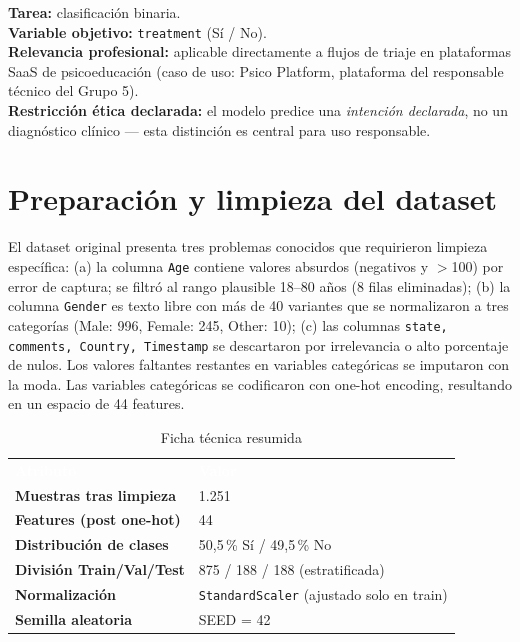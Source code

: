 \documentclass[10pt,a4paper,twocolumn]{article}
\begin{document}
\textbf{Tarea:} clasificación binaria.\\
\textbf{Variable objetivo:} \texttt{treatment} (Sí / No).\\
\textbf{Relevancia profesional:} aplicable directamente a flujos de triaje en plataformas SaaS de psicoeducación (caso de uso: Psico Platform, plataforma del responsable técnico del Grupo 5).\\
\textbf{Restricción ética declarada:} el modelo predice una \textit{intención declarada}, no un diagnóstico clínico — esta distinción es central para uso responsable.

\section{Preparación y limpieza del dataset}

El dataset original presenta tres problemas conocidos que requirieron limpieza específica: (a) la columna \texttt{Age} contiene valores absurdos (negativos y $>$100) por error de captura; se filtró al rango plausible 18--80 años (8 filas eliminadas); (b) la columna \texttt{Gender} es texto libre con más de 40 variantes que se normalizaron a tres categorías (Male: 996, Female: 245, Other: 10); (c) las columnas \texttt{state, comments, Country, Timestamp} se descartaron por irrelevancia o alto porcentaje de nulos. Los valores faltantes restantes en variables categóricas se imputaron con la moda. Las variables categóricas se codificaron con one-hot encoding, resultando en un espacio de 44 features.

\begin{table}[H]
\centering
\caption{Ficha técnica resumida}
\label{tab:ficha}
\footnotesize
\renewcommand{\arraystretch}{1.15}
\begin{tabularx}{\columnwidth}{>{\bfseries}lX}
\rowcolor{tableheader}\textcolor{white}{\textbf{Atributo}} & \textcolor{white}{\textbf{Valor}}\\
Muestras tras limpieza        & 1.251 \\
Features (post one-hot)       & 44 \\
Distribución de clases        & 50,5\,\% Sí / 49,5\,\% No \\
División Train/Val/Test       & 875 / 188 / 188 (estratificada) \\
Normalización                 & \texttt{StandardScaler} (ajustado solo en train) \\
Semilla aleatoria             & SEED = 42 \\
\end{tabularx}
\end{table}
\end{document}
